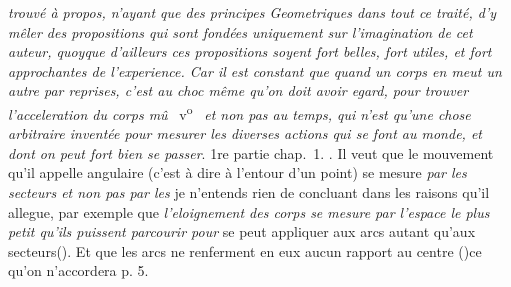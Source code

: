 %
%
\textit{trouvé à propos, n'ayant que des principes Geometriques
%
dans tout ce traité, d'y mêler des propositions qui sont fondées uniquement sur l'imagination de cet auteur, 
%
quoyque d'ailleurs ces propositions soyent fort belles, fort utiles, et fort approchantes de l'experience. 
%
Car il est constant que quand un corps en meut un autre par reprises, c'est au choc même qu'on doit 
%
avoir egard, pour trouver l'acceleration\protect{} du corps mû}
%
~v\textsuperscript{o}\rbrack\ 
%
\textit{et non pas au temps, qui n'est qu'une chose arbitraire inventée pour mesurer les diverses actions qui se font au monde, et dont on peut fort bien se passer}.
\pend
%
\pstart 1re partie chap.~1.
%
. 
%
Il veut que le mouvement qu'il appelle angulaire\protect{} 
%
(c'est à dire à l'entour d'un point) se mesure \textit{par les secteurs et non pas par les}
%
%
je n'entends rien de concluant dans les raisons qu'il allegue, par exemple que \textit{l'eloignement des corps se mesure par l'espace le plus petit qu'ils puissent parcourir pour}
%
%
se peut appliquer aux arcs\protect{} autant qu'aux secteurs\protect{}\protect\vphantom(). 
%
Et que les arcs ne renferment en eux aucun rapport au centre (\protect\vphantom)ce qu'on n'accordera
%
 \pend
%
\pstart p. 5.
%
